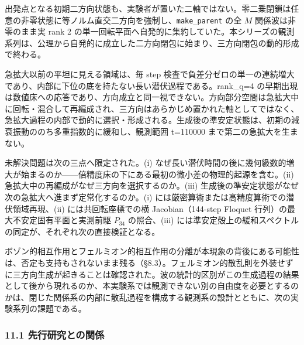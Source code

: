 \documentclass[
  a4paper,
]{ltjsarticle}
\begin{document}
出発点となる初期二方向状態も、実験者が置いた二軸ではない。零二乗閉鎖は任意の非零状態に等ノルム直交二方向を強制し、\texttt{make\_parent}
の全 \(M\) 関係波は非零のまま実 rank 2
の単一回転平面へ自発的に集約していた。本シリーズの観測系列は、公理から自発的に成立した二方向閉包に始まり、三方向閉包の動的形成で終わる。

急拡大以前の平坦に見える領域は、毎 step
検査で負差分ゼロの単一の連続増大であり、内部に下位の底を持たない長い潜伏過程である。rank\_q=4
の早期出現は数値床への応答であり、方向成立と同一視できない。方向部分空間は急拡大中に回転・混合して再編成され、三方向はあらかじめ置かれた軸としてではなく、急拡大過程の内部で動的に選択・形成される。生成後の準安定状態は、初期の減衰振動ののち多重指数的に緩和し、観測範囲
t=110000 まで第二の急拡大を生まない。

未解決問題は次の三点へ限定された。(i)
なぜ長い潜伏時間の後に幾何級数的増大が始まるのか------倍精度床の下にある最初の微小差の物理的起源を含む。(ii)
急拡大中の再編成がなぜ三方向を選択するのか。(iii)
生成後の準安定状態がなぜ次の急拡大へ進まず定常化するのか。(i)
には厳密算術または高精度算術での潜伏領域再現、(ii) には共回転座標での横
Jacobian（144-step Floquet 行列）の最大不安定固有平面と実測前駆
\(P_{34}\) の照合、(iii)
には準安定殻上の緩和スペクトルの同定が、それぞれ次の直接検証となる。

ボゾン的相互作用とフェルミオン的相互作用の分離が本現象の背後にある可能性は、否定も支持もされないまま残る（§8.3）。フェルミオン的散乱則を外装せずに三方向生成が起きることは確認された。波の統計的区別がこの生成過程の結果として後から現れるのか、本実験系では観測できない別の自由度を必要とするのかは、閉じた関係系の内部に散乱過程を構成する観測系の設計とともに、次の実験系列の課題である。

\subsubsection{11.1
先行研究との関係}\label{ux5148ux884cux7814ux7a76ux3068ux306eux95a2ux4fc2}
\end{document}
